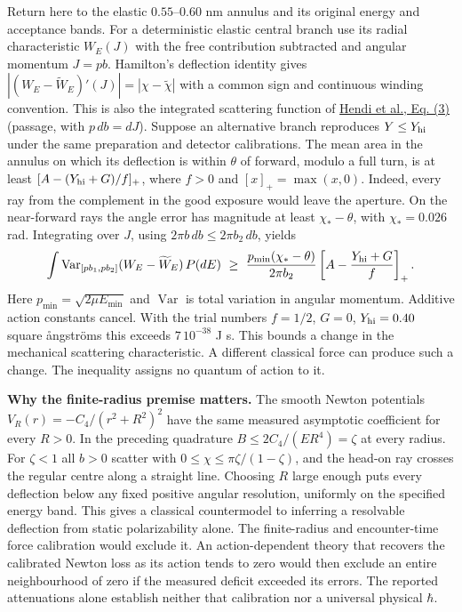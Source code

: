 \documentclass[11pt,a4paper]{article}
\begin{document}
Return here to the elastic \(0.55\)--\(0.60\) nm annulus and its
original energy and acceptance bands. For a deterministic elastic
central branch use its radial characteristic \(W_E(J)\) with the free
contribution subtracted and angular momentum \(J=p b\). Hamilton's
deflection identity gives
\(|(W_E-\widetilde W_E)'(J)|=|\chi-\widetilde\chi|\) with a common sign
and continuous winding convention. This is also the integrated
scattering function of
\href{https://arxiv.org/pdf/cond-mat/0605637}{Hendi et al., Eq. (3)}
(passage, with \(p\,db=dJ\)). Suppose an alternative branch reproduces
\(Y\le Y_{\rm hi}\) under the same preparation and detector
calibrations. The mean area in the annulus on which its deflection is
within \(\theta\) of forward, modulo a full turn, is at least
\([A-(Y_{\rm hi}+G)/f]_+\), where \(f>0\) and \([x]_+=\max(x,0)\).
Indeed, every ray from the complement in the good exposure would leave
the aperture. On the near-forward rays the angle error has magnitude at
least \(\chi_*-\theta\), with \(\chi_*=0.026\) rad. Integrating over
\(J\), using \(2\pi b\,db\le 2\pi b_2\,db\), yields \[
 \int {\rm Var}_{[pb_1,pb_2]}(W_E-\widetilde W_E)\,P(dE)
 \ \ge\
 \frac{p_{\min}(\chi_*-\theta)}{2\pi b_2}
 \left[A-\frac{Y_{\rm hi}+G}{f}\right]_+ .
\] Here \(p_{\min}=\sqrt{2\mu E_{\min}}\) and \(\operatorname{Var}\) is
total variation in angular momentum. Additive action constants cancel.
With the trial numbers \(f=1/2\), \(G=0\), \(Y_{\rm hi}=0.40\) square
ångströms this exceeds \(7\,10^{-38}\) J s. This bounds a change in the
mechanical scattering characteristic. A different classical force can
produce such a change. The inequality assigns no quantum of action to
it.

\textbf{Why the finite-radius premise matters.} The smooth Newton
potentials \(V_R(r)=-C_4/(r^2+R^2)^2\) have the same measured asymptotic
coefficient for every \(R>0\). In the preceding quadrature
\(B\le 2C_4/(ER^4)=\zeta\) at every radius. For \(\zeta<1\) all \(b>0\)
scatter with \(0\le\chi\le\pi\zeta/(1-\zeta)\), and the head-on ray
crosses the regular centre along a straight line. Choosing \(R\) large
enough puts every deflection below any fixed positive angular
resolution, uniformly on the specified energy band. This gives a
classical countermodel to inferring a resolvable deflection from static
polarizability alone. The finite-radius and encounter-time force
calibration would exclude it. An action-dependent theory that recovers
the calibrated Newton loss as its action tends to zero would then
exclude an entire neighbourhood of zero if the measured deficit exceeded
its errors. The reported attenuations alone establish neither that
calibration nor a universal physical \(\hbar\).
\end{document}
